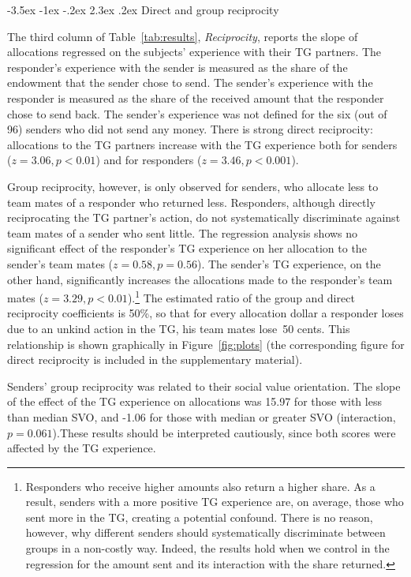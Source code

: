 \documentclass[12pt,a4paper]{article}\usepackage[]{graphicx}\usepackage[]{color}
\makeatletter
\renewcommand\subsection{\@startsection {subsection}{1}{\z@}%
{-3.5ex \@plus -1ex \@minus -.2ex}%
{2.3ex \@plus.2ex}%
{\it\large}}
\makeatother
\begin{document}
\subsection{Direct and group reciprocity}
\label{sec:reciprocity}

The third column of Table~\ref{tab:results}, \emph{Reciprocity}, reports the slope of
allocations regressed on the subjects' experience with their TG partners.
The responder's experience with the sender is measured
as the share of the endowment that the sender chose to send. The sender's experience with the responder is measured as the share
of the received amount that the responder chose to send back.
The sender's experience was not defined
for the six (out of 96) senders who did not send any money.
%
There is strong direct reciprocity: allocations
to the TG partners increase with the TG experience both for
senders ($z=3.06,p< 0.01$) and for responders
($z=3.46,p< 0.001$).

Group reciprocity, however, is only observed for senders, who allocate
less to team mates of a responder who returned less.
Responders,  although directly reciprocating the
TG partner's action, do not systematically discriminate against team mates
of a sender who sent little. The regression analysis shows no significant
effect of the responder's TG experience on her allocation to the sender's
team mates ($z=0.58,p= 0.56$).
The sender's TG experience, on the other
hand, significantly increases the allocations made to the responder's team mates
($z=3.29,p< 0.01$).\footnote{
  Responders who receive higher amounts also return a higher share. As a result, senders with a more positive TG experience are, on average, those who sent more in the TG, creating a potential confound. There is no reason, however, why different senders should systematically discriminate between groups in a non-costly way. Indeed, the results hold when we control in the regression for the amount sent and its interaction with the share returned.
}
The estimated ratio of the group and direct reciprocity coefficients
is 50\%, so that for every allocation dollar a responder
loses due to an unkind action in the TG, his team mates lose~50 cents.
This relationship is shown graphically in Figure~\ref{fig:plots} (the corresponding figure for direct reciprocity is
included in the supplementary material).




Senders' group reciprocity was related to their social value orientation. The slope of the effect of the TG experience
on allocations was
15.97 for those with less than median SVO, and
-1.06 for those with median or greater SVO
(interaction, $p= 0.061$).These results should be interpreted cautiously, since both scores were
affected by the TG experience.
\end{document}
